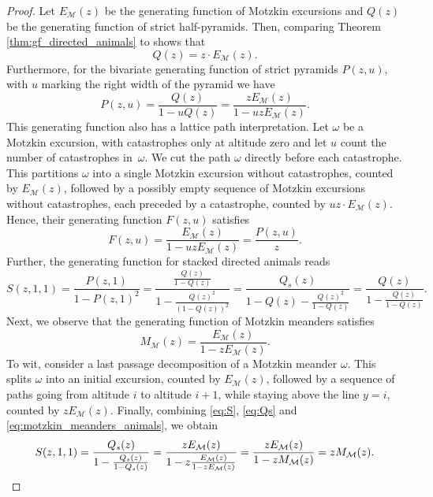 \documentclass{article}
\theoremstyle{definition}
\begin{document}
\begin{proof}
  Let $E_{\mathcal{M}}(z)$ be the generating function of Motzkin excursions and $Q(z)$ be the generating function of strict half-pyramids.
  Then, comparing Theorem \ref{thm:gf_directed_animals} to  shows that 
  \begin{equation}\label{eq:Qs}
    Q(z) = z \cdot E_\mathcal{M}(z).
  \end{equation}
  Furthermore, for the bivariate generating function of strict pyramids $P(z,u)$, with $u$ marking the right width of the pyramid we have 
  $$
    P(z,u) = \frac{Q(z)}{1-uQ(z)} = \frac{z E_\mathcal{M}(z)}{1-uzE_\mathcal{M}(z)}.
  $$
  This generating function also has a lattice path interpretation.
  Let $\omega$ be a Motzkin excursion, with catastrophes only at altitude zero and let $u$ count the number of catastrophes in~$\omega$. We cut the path $\omega$ directly before each catastrophe. This partitions $\omega$ into a single Motzkin excursion without catastrophes, counted by $E_\mathcal{M}(z)$, followed by a possibly empty sequence of Motzkin excursions without catastrophes, each preceded by a catastrophe, counted by $u z \cdot E_\mathcal{M}(z)$.
  Hence, their generating function $F(z,u)$ satisfies
  \begin{equation}\label{eq:Ps}
    F(z,u) = \frac{E_\mathcal{M}(z)}{1-uzE_\mathcal{M}(z)} = \frac{P(z,u)}{z}.
  \end{equation}
  Further, the generating function for stacked directed animals reads 
  \begin{equation*}\label{eq:S}
    S(z,1,1) = \frac{P(z,1)}{1-P(z,1)^{2}} = \frac{\frac{Q(z)}{1 - Q(z)}}{1 - \frac{Q(z)^2}{(1-Q(z))^2}} = \frac{Q_s(z)}{1 - Q(z) - \frac{Q(z)^2}{1 - Q(z)}}
    = \frac{Q(z)}{1 - \frac{Q(z)}{1 - Q(z)}}.
  \end{equation*}
  Next, we observe that the generating function of Motzkin meanders satisfies
  \begin{equation}\label{eq:motzkin_meanders_animals}
    M_\mathcal{M}(z) = \frac{E_\mathcal{M}(z)}{1-zE_\mathcal{M}(z)}.
  \end{equation}
  To wit, consider a last passage decomposition of a Motzkin meander $\omega$. This splits $\omega$ into an initial excursion, counted by $E_{\mathcal{M}}(z)$, followed by a sequence of paths going from altitude $i$ to altitude $i + 1$, while staying above the line $y = i$, counted by $z E_\mathcal{M}(z)$.
  Finally, combining \eqref{eq:S}, \eqref{eq:Qs} and \eqref{eq:motzkin_meanders_animals}, we obtain
  \begin{equation*}
    S(z,1,1) = \frac{Q_s(z)}{1 - \frac{Q_s(z)}{1 - Q_s(z)}} = \frac{zE_\mathcal{M}(z)}{1 - z\frac{E_\mathcal{M}(z)}{1-zE_\mathcal{M}(z)}} = \frac{zE_\mathcal{M}(z)}{1 - zM_\mathcal{M}(z)} = zM_\mathcal{M}(z). \qedhere
  \end{equation*}
\end{proof}
\end{document}
